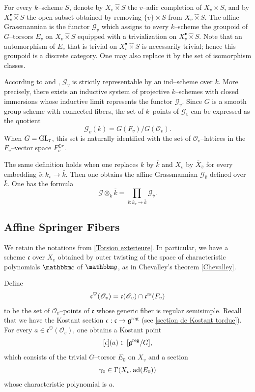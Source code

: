 \documentclass[12pt,english]{smfart}
\numberwithin{equation}{subsection}
\theoremstyle{remark}
\newcommand\calO{{\mathscr O}}
\newcommand\calQ{{\mathscr G}} %
\newcommand\calG{{\mathscr G}}
\newcommand\frakg{{\mathfrak g}}
\newcommand\frakc{{\mathfrak c}}
\newcommand\bbg{{\mathbbm g}}
\newcommand\bbc{{\mathbbm c}}
\newcommand\GL{{\rm GL}}
\newcommand\ad{{\rm ad}}
\newcommand\rs{{\rm rs}}
\newcommand\reg{{\rm reg}}
\begin{document}
For every $k$--scheme $S$, denote by $X_v\hat\times S$ the $v$--adic completion of $X_v\times S$, and by $X_v^\bullet\hat\times S$ the open subset obtained by removing $\{v\}\times S$ from $X_v\hat\times S$. The affine Grassmannian is the functor $\calQ_v$ which assigns to every $k$--scheme the groupoid of $G$--torsors $E_v$ on $X_v\hat\times S$ equipped with a trivialization on $X_v^\bullet\hat\times S$. Note that an automorphism of $E_v$ that is trivial on $X_v^\bullet\hat\times S$ is necessarily trivial; hence this groupoid is a discrete category. One may also replace it by the set of isomorphism classes.

According to \cite{BL} and \cite{Fa-loop}, $\calQ_v$ is strictly representable by an ind--scheme over $k$. More precisely, there exists an inductive system of projective $k$--schemes with closed immersions whose inductive limit represents the functor $\calQ_v$. Since $G$ is a smooth group scheme with connected fibers, the set of $k$--points of $\calQ_v$ can be expressed as the quotient
$$
\calQ_v(k)=G(F_v)/G(\calO_v).
$$
When $G=\GL_r$, this set is naturally identified with the set of $\calO_v$--lattices in the $F_v$--vector space $F_v^{\oplus r}$.

The same definition holds when one replaces $k$ by $\bar{k}$ and $X_v$ by $\bar{X}_{\bar{v}}$ for every embedding $\bar{v}:k_v\rightarrow \bar{k}$. Then one obtains the affine Grassmannian $\calG_{\bar{v}}$ defined over $\bar{k}$. One has the formula
$$
\calG\otimes_k \bar{k}=\prod_{\bar{v}:k_v\rightarrow \bar{k}} \calG_{\bar{v}}.
$$

\subsection{Affine Springer Fibers}\label{Springer}
We retain the notations from \ref{Torsion exterieure}. In particular, we have a scheme $\frakc$ over $X_v$ obtained by outer twisting of the space of characteristic polynomials $\bbc$ of $\bbg$, as in Chevalley's theorem \ref{Chevalley}.

Define
$$
\frakc^\heartsuit(\calO_v)=\frakc(\calO_v)\cap \frakc^{\rs}(F_v)
$$
to be the set of $\calO_v$--points of $\frakc$ whose generic fiber is regular semisimple. Recall that we have the Kostant section $\epsilon:\frakc\rightarrow \frakg^\reg$ (see \ref{section de Kostant tordue}). For every $a\in \frakc^\heartsuit(\calO_v)$, one obtains a Kostant point
$$
[\epsilon](a)\in [\frakg^\reg/G],
$$
which consists of the trivial $G$--torsor $E_0$ on $X_v$ and a section
$$
\gamma_0\in \Gamma(X_v,\ad(E_0))
$$
whose characteristic polynomial is $a$.
\end{document}
